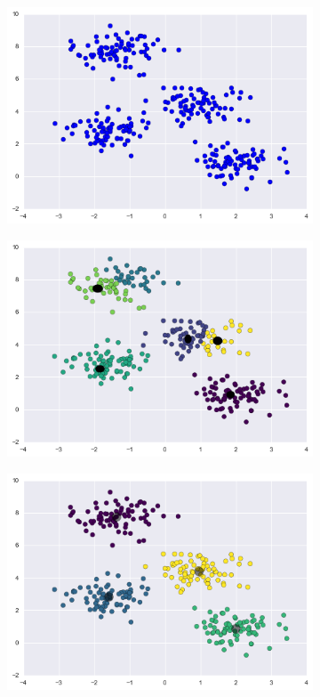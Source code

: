 \begin{figure}[h]
    \centering
    \begin{subfigure}[b]{.33\textwidth}
        \centering
        \includegraphics[width=1\textwidth]{fig/kmeans/1.png}
    \end{subfigure}\hfill
    \begin{subfigure}[b]{.33\textwidth}
        \centering
        \includegraphics[width=1\textwidth]{fig/kmeans/2.png}
    \end{subfigure}
    \begin{subfigure}[b]{.33\textwidth}
        \centering
        \includegraphics[width=1\textwidth]{fig/kmeans/3.png}

\end{subfigure}
\end{figure}
